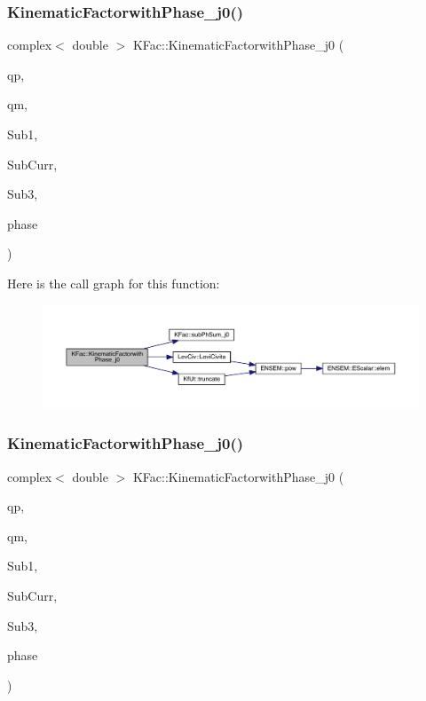 \subsubsection{\texorpdfstring{KinematicFactorwithPhase\_j0()}{KinematicFactorwithPhase\_j0()}\hspace{0.1cm}{\footnotesize\ttfamily [1/2]}}
{\footnotesize\ttfamily complex$<$ double $>$ K\+Fac\+::\+Kinematic\+Factorwith\+Phase\+\_\+j0 (\begin{DoxyParamCaption}\item[{Eigen\+::\+Vector\+Xd \&}]{qp,  }\item[{Eigen\+::\+Vector\+Xd \&}]{qm,  }\item[{map$<$ int, Eigen\+::\+Matrix\+Xcd $>$ \&}]{Sub1,  }\item[{Eigen\+::\+Matrix\+Xcd \&}]{Sub\+Curr,  }\item[{map$<$ int, Eigen\+::\+Matrix\+Xcd $>$ \&}]{Sub3,  }\item[{\mbox{\hyperlink{structPh_1_1phChars}{Ph\+::ph\+Chars}} \&}]{phase }\end{DoxyParamCaption})}

Here is the call graph for this function\+:
\nopagebreak
\begin{figure}[H]
\begin{center}
\leavevmode
\includegraphics[width=350pt]{d2/d89/namespaceKFac_a8a20f176fbf91758f8699734b8df3f04_cgraph}
\end{center}
\end{figure}
\mbox{\label{namespaceKFac_a87a5304db9d4c659637da23e363cf4a4}} 
\subsubsection{\texorpdfstring{KinematicFactorwithPhase\_j0()}{KinematicFactorwithPhase\_j0()}\hspace{0.1cm}{\footnotesize\ttfamily [2/2]}}
{\footnotesize\ttfamily complex$<$ double $>$ K\+Fac\+::\+Kinematic\+Factorwith\+Phase\+\_\+j0 (\begin{DoxyParamCaption}\item[{Eigen\+::\+Vector\+Xd \&}]{qp,  }\item[{Eigen\+::\+Vector\+Xd \&}]{qm,  }\item[{map$<$ int, Eigen\+::\+Matrix\+Xcd $>$ \&}]{Sub1,  }\item[{map$<$ int, Eigen\+::\+Matrix\+Xcd $>$ \&}]{Sub\+Curr,  }\item[{map$<$ int, Eigen\+::\+Matrix\+Xcd $>$ \&}]{Sub3,  }\item[{\mbox{\hyperlink{structPh_1_1phChars}{Ph\+::ph\+Chars}} \&}]{phase }\end{DoxyParamCaption})}

